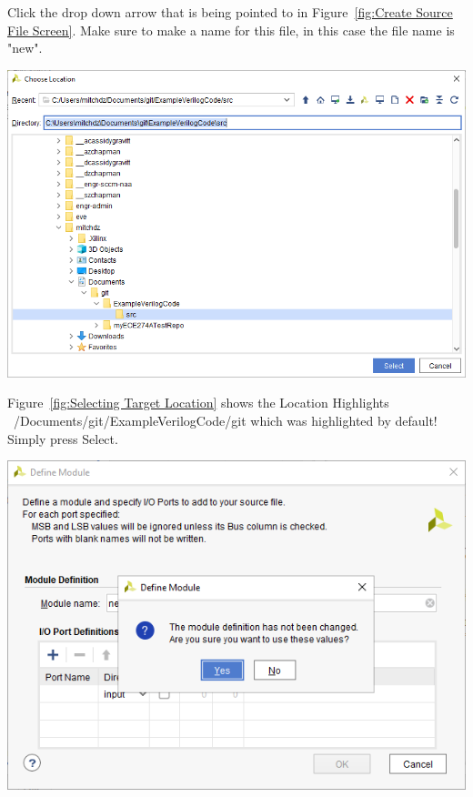 \documentclass[12pt]{article}
\begin{document}
Click the drop down arrow that is being pointed to in Figure~\ref{fig:Create Source File Screen}. Make sure to make a name for this file, in this case the file name is "new".

\begin{center}
    \includegraphics[scale=0.5]{viv_13.PNG}
    \label{fig:Selecting Target Location}
\end{center}

Figure~\ref{fig:Selecting Target Location} shows the Location Highlights ~/Documents/git/ExampleVerilogCode/git which was highlighted by default! Simply press Select.

\begin{center}
    \includegraphics[scale=0.7]{viv_14.PNG}
    \label{fig:Defining Module for New File}
\end{center}
\end{document}
